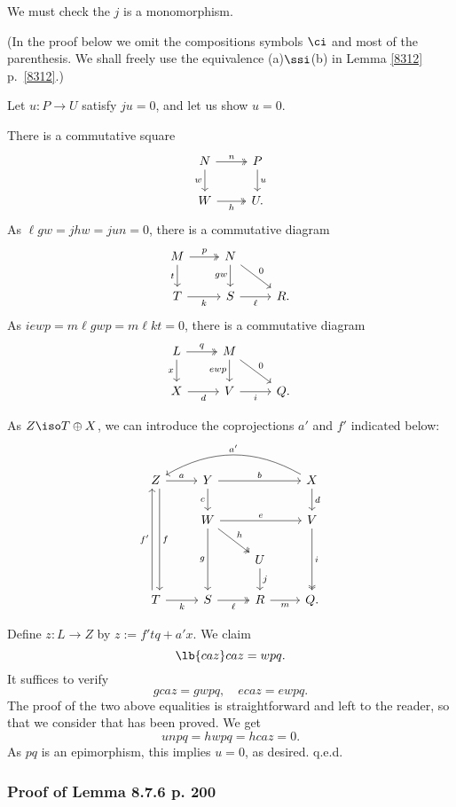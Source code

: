 \documentclass[12pt]{article}
\theoremstyle{remark}
\theoremstyle{definition}
\begin{document}
We must check the $j$ is a monomorphism. 

(In the proof below we omit the compositions symbols $\ci$ and most of the parenthesis. We shall freely use the equivalence (a)$\ssi$(b) in Lemma \ref{8312} p.~\ref{8312}.)

Let $u:P\to U$ satisfy $ju=0$, and let us show $u=0$. 

There is a commutative square 
$$
\begin{tikzcd} 
N\ar[d,"w"']\ar[r,twoheadrightarrow,"n"]&P\ar[d,"u"]\\ 
W\ar[r,twoheadrightarrow,"h"']&U.
\end{tikzcd}
$$ 
As $\ell gw=jhw=jun=0$, there is a commutative diagram 
$$
\begin{tikzcd} 
M\ar[d,"t"']\ar[r,twoheadrightarrow,"p"]&N\ar[d,"gw"']\ar[rd,"0"]\\ 
T\ar[r,"k"']&S\ar[r,"\ell"']&R.
\end{tikzcd}
$$ 
As $iewp=m\ell gwp=m\ell kt=0$, there is a commutative diagram 
$$
\begin{tikzcd} 
L\ar[d,"x"']\ar[r,twoheadrightarrow,"q"]&M\ar[d,"ewp"']\ar[rd,"0"]\\ 
X\ar[r,"d"']&V\ar[r,"i"']&Q.
\end{tikzcd}
$$

As $Z\iso T\oplus X$, we can introduce the coprojections $a'$ and $f'$ indicated below:
$$
\begin{tikzcd} 
Z\ar[ddd,xshift=0.7ex,"f"]\ar[r,"a"]&Y\ar[d,"c"']\ar[rr,"b"]&&X\ar[d,"d"]\ar[lll,bend right,"a'"']\\ 
&W\ar[dd,"g"']\ar[rd,twoheadrightarrow,"h"]\ar[rr,"e"]&&V\ar[dd,twoheadrightarrow,"i"]\\ 
&&U\ar[d,"j"]\\ 
T\ar[uuu,xshift=-0.7ex,"f'"]\ar[r,"k"']&S\ar[r,twoheadrightarrow,"\ell"']&R\ar[r,"m"']&Q.
\end{tikzcd}
$$ 

Define $z:L\to Z$ by $z:=f'tq+a'x$. We claim 
\begin{equation}\lb{caz}
caz=wpq.
\end{equation} 
It suffices to verify 
$$
gcaz=gwpq,\quad ecaz=ewpq.
$$ 
The proof of the two above equalities is straightforward and left to the reader, so that we consider that  has been proved. We get 
$$
unpq=hwpq=hcaz=0.
$$ 
As $pq$ is an epimorphism, this implies $u=0$, as desired. q.e.d.

%

\subsubsection{Proof of Lemma 8.7.6 p. 200}
\end{document}
